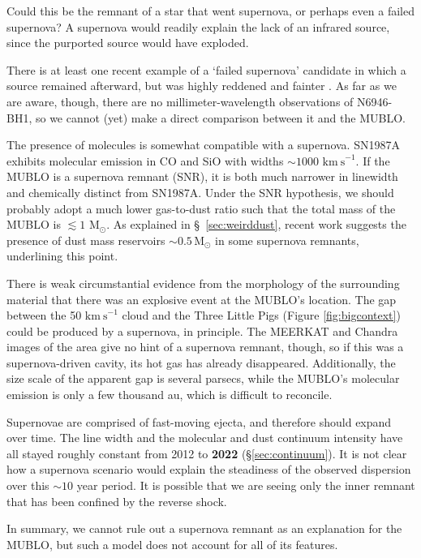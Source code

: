 \documentclass[]{aastex631}
\newcommand{\msun}{\ensuremath{\mathrm{M}_\odot}\xspace}
\newcommand{\kms}{\ensuremath{\mathrm{km~s}^{-1}}\xspace}
\def\rr#1{\textbf{#1}}
\begin{document}
Could this be the remnant of a star that went supernova, or perhaps even a failed supernova?
A supernova would readily explain the lack of an infrared source, since the purported source would have exploded.

There is at least one recent example of a `failed supernova' candidate in which a source remained afterward, but was highly reddened and fainter \citep{Adams2017,Beasor2023,Kochanek2024}.
As far as we are aware, though, there are no millimeter-wavelength observations of N6946-BH1, so we cannot (yet) make a direct comparison between it and the MUBLO.

The presence of molecules is somewhat compatible with a supernova.
SN1987A exhibits molecular emission in CO and SiO with widths $\sim1000$ \kms \citep{Cigan2019}.
If the MUBLO is a supernova remnant (SNR), it is both much narrower in linewidth and chemically distinct from SN1987A.
Under the SNR hypothesis, we should probably adopt a much lower gas-to-dust ratio such that the total mass of the MUBLO is $\lesssim1$ \msun.
As explained in \S~\ref{sec:weirddust}, recent work suggests the presence of dust mass reservoirs $\sim{}0.5\,\msun$ in some supernova remnants, underlining this point. 

There is weak circumstantial evidence from the morphology of the surrounding material that there was an explosive event at the MUBLO's location.
The gap between the 50 \kms cloud and the Three Little Pigs (Figure \ref{fig:bigcontext}) could be produced by a supernova, in principle.
The MEERKAT and Chandra images of the area give no hint of a supernova remnant, though, so if this was a supernova-driven cavity, its hot gas has already disappeared.
Additionally, the size scale of the apparent gap is several parsecs, while the MUBLO's molecular emission is only a few thousand au, which is difficult to reconcile.

Supernovae are comprised of fast-moving ejecta, and therefore should expand over time.
The line width and the molecular and dust continuum intensity have all stayed roughly constant from 2012 to \rr{2022} (\S \ref{sec:continuum}).
It is not clear how a supernova scenario would explain the steadiness of the observed dispersion over this $\sim10$ year period.
It is possible that we are seeing only the inner remnant that has been confined by the reverse shock.

In summary, we cannot rule out a supernova remnant as an explanation for the MUBLO, but such a model does not account for all of its features.
\end{document}
